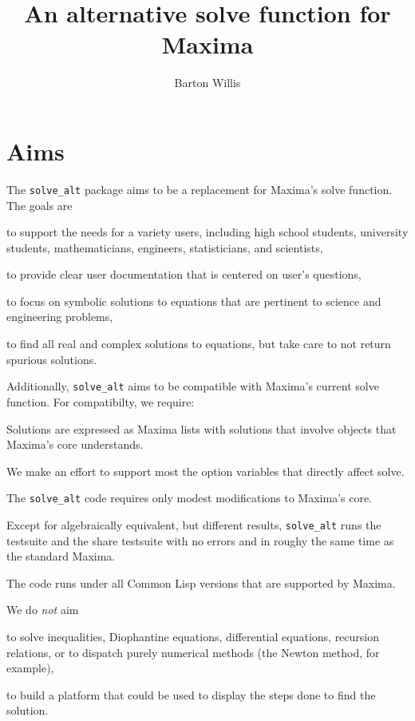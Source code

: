 \documentclass[]{scrartcl}
\title{An alternative solve function for Maxima}
\author{Barton Willis}
\newcommand{\altsolve}{\texttt{solve\_alt}}
\begin{document}
\maketitle

\section{Aims}


The \altsolve\/ package aims to be a replacement for Maxima's solve function. The goals are

\begin{alphalist}[]

\item to support the needs for a variety users, including high school students, university students, mathematicians, engineers, statisticians, and scientists,

\item to provide clear user documentation that is centered  on user's questions,

\item to focus on symbolic solutions to equations that are pertinent to science and engineering problems,

\item to find all real and complex solutions to equations, but take care to not return spurious solutions.

\end{alphalist}
Additionally, \altsolve\/  aims to be compatible with Maxima's current solve function. For compatibilty, we require:

\begin{alphalist}[]

\item Solutions are expressed as Maxima lists with solutions that involve objects that Maxima's core  understands.

\item We make an effort to support most the option variables that directly affect solve.

 \item The \altsolve\/ code requires only modest modifications to Maxima's core.

\item Except for algebraically equivalent, but different results, \altsolve\/  runs the testsuite and the share testsuite with no errors and in roughy the same time as the standard Maxima.

\item The code runs under all Common Lisp versions that are supported by Maxima.
\end{alphalist}
We do \emph{not} aim
\begin{alphalist}[]

\item to solve inequalities, Diophantine equations, differential equations, recursion relations, or to dispatch purely numerical methods (the Newton method, for example),

\item to build a platform that could be used to display the steps done to find the solution.

\end{alphalist}
\end{document}
